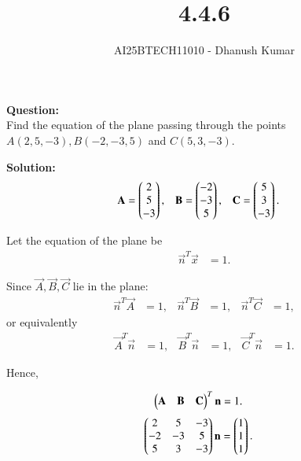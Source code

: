 \documentclass[journal]{IEEEtran}
\begin{document}
\title{4.4.6}
\author{AI25BTECH11010 - Dhanush Kumar}
\maketitle
\renewcommand{\thefigure}{\theenumi}
\renewcommand{\thetable}{\theenumi}

\noindent
\textbf{Question:}\\
Find the equation of the plane passing through the points 
$A(2, 5, -3), B(-2, -3, 5)$ and $C(5, 3, -3)$.
\bigskip

\noindent
\textbf{Solution:}\\

\begin{align}
\mathbf{A} &= \begin{pmatrix}2 \\ 5 \\ -3\end{pmatrix}, & 
\mathbf{B} &= \begin{pmatrix}-2 \\ -3 \\ 5\end{pmatrix}, & 
\mathbf{C} &= \begin{pmatrix}5 \\ 3 \\ -3\end{pmatrix}.
\end{align}

Let the equation of the plane be
\begin{align}
\vec{n}^T \vec{x} &= 1.
\end{align}

Since $\vec{A}, \vec{B}, \vec{C}$ lie in the plane:
\begin{align}
\vec{n}^T \vec{A} &= 1, & 
\vec{n}^T \vec{B} &= 1, & 
\vec{n}^T \vec{C} &= 1,
\end{align}
or equivalently
\begin{align}
\vec{A}^T \vec{n} &= 1, & 
\vec{B}^T \vec{n} &= 1, & 
\vec{C}^T \vec{n} &= 1.
\end{align}

Hence,


\begin{align}
\begin{pmatrix}\mathbf{A} & \mathbf{B} & \mathbf{C}\end{pmatrix}^{T} \mathbf{n} 
&= 1.
\end{align}
\begin{align}
\begin{pmatrix} 2 & 5 & -3 \\ -2 & -3 & 5 \\ 5 & 3 & -3\end{pmatrix}\mathbf{n}
&= \begin{pmatrix}1 \\ 1 \\ 1\end{pmatrix}.
\end{align}
\end{document}
